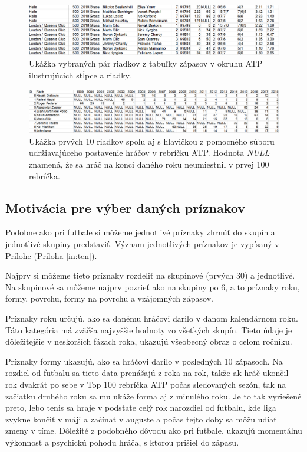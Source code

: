 \noindent
\begin{figure}[b]
\includegraphics[width=\textwidth]{../img/atp.png}
\caption{Ukážka vybraných pár riadkov z tabuľky zápasov v okruhu ATP ilustrujúcich stĺpce a riadky.}
\end{figure}

\noindent
\begin{figure}
\label{rank}
\includegraphics[width=\textwidth]{../img/rank.png}
\caption{Ukážka prvých 10 riadkov spolu aj s hlavičkou z pomocného súboru udržiavajúceho postavenie hráčov v rebríčku ATP. Hodnota \textit{NULL} znamená, že sa hráč na konci daného roku neumiestnil v prvej 100 rebríčka.}
\end{figure}

\subsection{Motivácia pre výber daných príznakov}
Podobne ako pri futbale si môžeme jednotlivé príznaky zhrnúť do skupín a jednotlivé skupiny predstaviť. Význam jednotlivých príznakov je vypísaný v Prílohe (Príloha \ref{in:ten}).

Najprv si môžeme tieto príznaky rozdeliť na skupinové (prvých 30) a jednotlivé.
Na skupinové sa môžeme najprv pozrieť ako na skupiny po 6, a to príznaky roku, formy, povrchu, formy na povrchu a vzájomných zápasov.

Príznaky roku určujú, ako sa danému hráčovi darilo v danom kalendárnom roku.
Táto kategória má zväčša najvyššie hodnoty zo všetkých skupín. Tieto údaje je dôležitejšie v neskorších fázach roka, ukazujú všeobecný obraz o celom ročníku.

Príznaky formy ukazujú, ako sa hráčovi darilo v posledných 10 zápasoch. Na rozdiel od futbalu sa tieto data prenášajú z roka na rok, takže ak hráč ukončil rok dvakrát po sebe v Top 100 rebríčka ATP počas sledovaných sezón, tak na začiatku druhého roku sa mu ukáže forma aj z minulého roku. Je to tak vyriešené preto, lebo tenis sa hraje v podstate celý rok narozdiel od futbalu, kde liga zvykne končiť v máji a začínať v auguste a počas tejto doby sa môžu udiať zmeny v tíme.
Dôležité z podobného dôvodu ako pri futbale, ukazujú momentálnu výkonnosť a psychickú pohodu hráča, s ktorou prišiel do zápasu.

